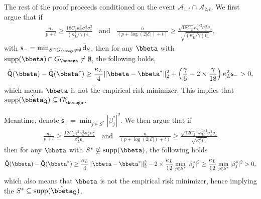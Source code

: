 \documentclass[10pt]{article}
\numberwithin{equation}{section}
\newcommand*{\supp}{\mathrm{supp}}
\begin{document}
The rest of the proof proceeds conditioned on the event $\mathcal{A}_{1,t} \cap \mathcal{A}_{2,t}$. We first argue that if
\begin{align}
\label{eq:low-dim-cond-n-2}
    \frac{n_*}{p + t} \ge \frac{18C_2 \kappa_U^3\sigma_x^4\sigma_\varepsilon^2}{(\kappa_L^3/\gamma)\mathsf{s}_-} ~~~~\text{and}~~~~ \frac{\bar{n}}{(p + \log(2|\mathcal{E}|) + t)} \ge \frac{\sqrt{18C_2} \kappa_U^{3/2} \sigma_x^3\sigma_\varepsilon}{\sqrt{(\kappa_L^3/\gamma) \mathsf{s}_{-}}},
\end{align} with $\mathsf{s}_{-} = \min_{S\cap G_{\bomega} \neq \emptyset} \bar{\mathsf{d}}_S$, then for any $\bbeta$ with $\supp(\bbeta) \cap G_{\bomega} \neq \emptyset$, the following holds,
\begin{align*}
    \hat{\mathsf{Q}}(\bbeta) - \hat{\mathsf{Q}}(\bbeta^*) \ge \frac{\kappa_L}{4} \|\bbeta - \bbeta^*\|_2^2 + \left(\frac{\gamma}{6} - 2\times \frac{\gamma}{18} \right) \kappa_L^2 \mathsf{s}_- > 0,
\end{align*} which means $\bbeta$ is not the empirical risk minimizer. This implies that $\supp(\hat{\bbeta}_{\mathsf{Q}}) \subseteq G_{\bomega}^c$. 

Meantime, denote $\mathsf{s}_+ = \min_{j\in S^*} |\beta_j^*|^2$. We then argue that if
\begin{align}
\label{eq:low-dim-cond-n-3}
    \frac{n_*}{p + t} \ge \frac{12C_2 \gamma^2 \kappa_U^3\sigma_x^4\sigma_\varepsilon^2}{\kappa_L^2 \mathsf{s}_+} ~~~~\text{and}~~~~ \frac{\bar{n}}{(p + \log(2|\mathcal{E}|) + t)} \ge \frac{\sqrt{12C_2}\gamma \kappa_U^{3/2} \sigma_x^3\sigma_\varepsilon}{  \sqrt{\kappa_L^2 \mathsf{s}_{+}}}
\end{align} then for any $\bbeta$ with $S^* \nsubseteq \supp(\bbeta)$, the following holds
\begin{align*}
    \hat{\mathsf{Q}}(\bbeta) - \hat{\mathsf{Q}}(\bbeta^*) \ge \frac{\kappa_L}{4} \|\bbeta - \bbeta^*\|_2^2 - 2\times \frac{\kappa_L}{12} \min_{j\in S^*} |\beta_j^*|^2 \ge \frac{\kappa_L}{12} \min_{j\in S^*} |\beta_j^*|^2 > 0,
\end{align*} which also means that $\bbeta$ is not the empirical risk minimizer, hence implying the $S^*\subseteq \supp(\hat{\bbeta}_{\mathsf{Q}})$. 
\end{document}
